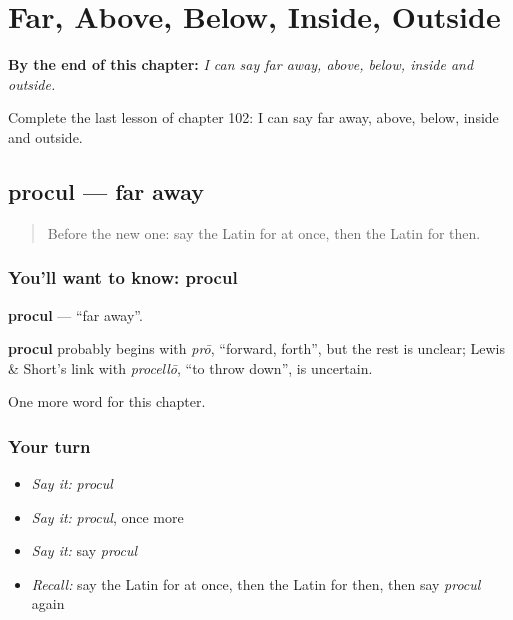 
\chapter{Far, Above, Below, Inside, Outside}
\label{ch:la-far-above-below-inside-outside}

\begin{chapteropening}
\textbf{By the end of this chapter:} \emph{I can say far away, above, below, inside and outside.}

Complete the last lesson of chapter 102: I can say far away, above, below, inside and outside.
\end{chapteropening}

\section[procul]{procul — far away}

\label{lesson:LA-C102-procul}



\begin{quote}
Before the new one: say the Latin for at once, then the Latin for then.
\end{quote}

\subsection*{You'll want to know: procul}
\textbf{procul} — \textquotedblleft{}far away\textquotedblright{}.

\begin{cousinweb}
\textbf{procul} probably begins with \emph{prō}, \textquotedblleft{}forward, forth\textquotedblright{}, but the rest is unclear; Lewis \& Short's link with \emph{procellō}, \textquotedblleft{}to throw down\textquotedblright{}, is uncertain.
\end{cousinweb}

\begin{grammarlens}[title={What you've built}]
One more word for this chapter.
\end{grammarlens}

\subsection*{Your turn}
\begin{itemize}
\raggedright
  \item \emph{Say it:} \emph{procul}
  \item \emph{Say it:} \emph{procul}, once more
  \item \emph{Say it:} say \emph{procul}
  \item \emph{Recall:} say the Latin for at once, then the Latin for then, then say \emph{procul} again
\end{itemize}

